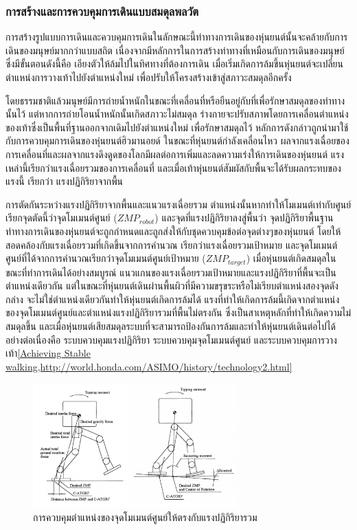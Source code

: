 \subsubsection{การสร้างและการควบคุมการเดินแบบสมดุลพลวัต}
การสร้างรูปแบบการเดินและควบคุมการเดินในลักษณะนี้ท่าทางการเดินของหุ่นยนต์นั้นจะคล้ายกับการเดินของมนุษย์มากกว่าแบบสถิต
เนื่องจากมีหลักการในการสร้างท่าทางที่เหมือนกับการเดินของมนุษย์ซึ่งมีขั้นตอนดังนี้คือ เอียงตัวให้ล้มไปในทิศทางที่ต้องการเดิน
เมื่อเริ่มเกิดการล้มขึ้นหุ่นยนต์จะเปลี่ยนตำแหน่งการวางเท้าไปยังตำแหน่งใหม่ เพื่อปรับให้โครงสร้างเข้าสู่สภาวะสมดุลอีกครั้ง

โดยธรรมชาติแล้วมนุษย์มีการถ่ายน้ำหนักในขณะที่เคลื่อนที่หรือยืนอยู่กับที่เพื่อรักษาสมดุลของท่าทางนั้นไว้
แต่หากการถ่ายโอนน้ำหนักนั้นเกิดสภาวะไม่สมดุล ร่างกายจะปรับสภาพโดยการเคลื่อนตำแหน่งของเท้าซึ่งเป็นพื้นที่ฐานออกจากเดิมไปยังตำแหน่งใหม่
เพื่อรักษาสมดุลไว้ หลักการดังกล่าวถูกนำมาใช้กับการควบคุมการเดินของหุ่นยนต์ฮิวมานอยด์ ในขณะที่หุ่นยนต์กำลังเคลื่อนไหว
ผลจากแรงเฉื่อยของการเคลื่อนที่และผลจากแรงดึงดูดของโลกมีผลต่อการเพิ่มและลดความเร่งให้การเดินของหุ่นยนต์
แรงเหล่านี้เรียกว่าแรงเฉื่อยรวมของการเคลื่อนที่ และเมื่อเท้าหุ่นยนต์สัมผัสกับพื้นจะได้รับผลกระทบของแรงนี้ เรียกว่า
แรงปฏิกิริยาจากพื้น

การตัดกันระหว่างแรงปฏิกิริยาจากพื้นและแนวแรงเฉื่อยรวม ตำแหน่งนั้นหากทำให้โมเมนต์เท่ากับศูนย์
เรียกจุดตัดนี้ว่าจุดโมเมนต์ศูนย์ ($ZMP_{robot}$) และจุดที่แรงปฏิกิริยาลงสู่พื้นว่า จุดปฏิกิริยาพื้นฐาน 
ท่าทางการเดินของหุ่นยนต์จะถูกกำหนดและถูกส่งให้กับชุดควบคุมข้อต่อจุดต่างๆของหุ่นยนต์ โดยให้สอดคล้องกับแรงเฉื่อยรวมที่เกิดขึ้นจากการคำนวณ
เรียกว่าแรงเฉื่อยรวมเป้าหมาย และจุดโมเมนต์ศูนย์ที่ได้จากการคำนวณเรียกว่าจุดโมเมนต์ศูนย์เป้าหมาย ($ZMP_{target}$)
เมื่อหุ่นยนต์เกิดสมดุลในขณะที่ทำการเดินได้อย่างสมบูรณ์ แนวแกนของแรงเฉื่อยรวมเป้าหมายและแรงปฏิกิริยาที่พื้นจะเป็นตำแหน่งเดียวกัน
แต่ในขณะที่หุ่นยนต์เดินผ่านพื้นผิวที่มีความขรุขระหรือไม่เรียบตำแหน่งสองจุดดังกล่าง จะไม่ใช่ตำแหน่งเดียวกันทำให้หุ่นยนต์เกิดการล้มได้
แรงที่ทำให้เกิดการล้มนี้เกิดจากตำแหน่งของจุดโมเมนต์ศูนย์และตำแหน่งแรงปฏิกิริยารวมที่พื้นไม่ตรงกัน ซึ่งเป็นสาเหตุหลักที่ทำให้เกิดความไม่สมดุลขึ้น
และเมื่อหุ่นยนต์เสียสมดุลระบบที่จะสามารถป้องกันการล้มและทำให้หุ่นยนต์เดินต่อไปได้อย่างต่อเนื่องคือ ระบบควบคุมแรงปฏิกิริยา
ระบบควบคุมจุดโมเมนต์ศูนย์ และระบบควบคุมการวางเท้า\ref{Achieving Stable walking,http://world.honda.com/ASIMO/history/technology2.html}

\begin{figure}[!ht]
	\centering
	\includegraphics[width=0.7\textwidth]{chapter2/images/zmpdynamicwalking.png}
	\caption{การควบคุมตำแหน่งของจุดโมเมนต์ศูนย์ให้ตรงกับแรงปฏิกิริยารวม}
	\label{fig:robot_zmp_support}
\end{figure}

